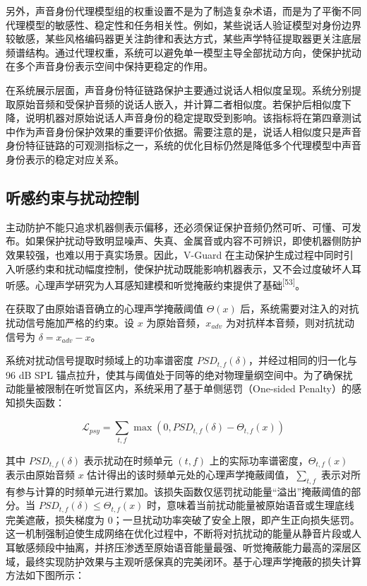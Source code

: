 另外，声音身份代理模型组的权重设置不是为了制造复杂术语，而是为了平衡不同代理模型的敏感性、稳定性和任务相关性。例如，某些说话人验证模型对身份边界较敏感，某些风格编码器更关注韵律和表达方式，某些声学特征提取器更关注底层频谱结构。通过代理权重，系统可以避免单一模型主导全部扰动方向，使保护扰动在多个声音身份表示空间中保持更稳定的作用。

在系统展示层面，声音身份特征链路保护主要通过说话人相似度呈现。系统分别提取原始音频和受保护音频的说话人嵌入，并计算二者相似度。若保护后相似度下降，说明机器对原始说话人声音身份的稳定提取受到影响。该指标将在第四章测试中作为声音身份保护效果的重要评价依据。需要注意的是，说话人相似度只是声音身份特征链路的可观测指标之一，系统的优化目标仍然是降低多个代理模型中声音身份表示的稳定对应关系。

\subsection{听感约束与扰动控制}\label{ux542cux611fux7ea6ux675fux4e0eux6270ux52a8ux63a7ux5236}

主动防护不能只追求机器侧表示偏移，还必须保证保护音频仍然可听、可懂、可发布。如果保护扰动导致明显噪声、失真、金属音或内容不可辨识，即使机器侧防护效果较强，也难以用于真实场景。因此，V-Guard
在主动保护生成过程中同时引入听感约束和扰动幅度控制，使保护扰动既能影响机器表示，又不会过度破坏人耳听感。心理声学研究为人耳感知建模和听觉掩蔽约束提供了基础\textsuperscript{{[}53{]}}。

在获取了由原始语音确立的心理声学掩蔽阈值
\(\Theta(x)\)
后，系统需要对注入的对抗扰动信号施加严格的约束。设 \(x\)
为原始音频，\(x_{adv}\) 为对抗样本音频，则对抗扰动信号为
\(\delta = x_{adv} - x\)。

系统对扰动信号提取时频域上的功率谱密度
\(PSD_{t,f}(\delta)\)，并经过相同的归一化与 96 dB SPL
锚点拉升，使其与阈值处于同等的绝对物理量纲空间中。为了确保扰动能量被限制在听觉盲区内，系统采用了基于单侧惩罚（One-sided
Penalty）的感知损失函数：

\[\mathcal{L}_{psy} = \sum_{t,f}^{}\max\left( 0,PSD_{t,f}(\delta) - \Theta_{t,f}(x) \right)\]

其中 \(PSD_{t,f}(\delta)\) 表示扰动在时频单元 \((t,f)\)
上的实际功率谱密度，\(\Theta_{t,f}(x)\) 表示由原始音频 \(x\)
估计得出的该时频单元处的心理声学掩蔽阈值，\(\sum_{t,f}^{}\)
表示对所有参与计算的时频单元进行累加。该损失函数仅惩罚扰动能量``溢出''掩蔽阈值的部分。当
\(PSD_{t,f}(\delta) \leq \Theta_{t,f}(x)\)
时，意味着当前扰动能量被原始语音或生理底线完美遮蔽，损失梯度为
0；一旦扰动功率突破了安全上限，即产生正向损失惩罚。这一机制强制迫使生成网络在优化过程中，不断将对抗扰动的能量从静音片段或人耳敏感频段中抽离，并挤压渗透至原始语音能量最强、听觉掩蔽能力最高的深层区域，最终实现防护效果与主观听感保真的完美闭环。基于心理声学掩蔽的损失计算方法如下图所示：


